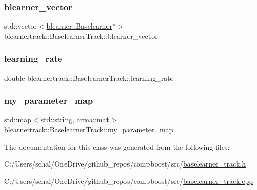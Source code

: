 \subsubsection{\texorpdfstring{blearner\+\_\+vector}{blearner\_vector}}
{\footnotesize\ttfamily std\+::vector$<$\mbox{\hyperlink{classblearner_1_1_baselearner}{blearner\+::\+Baselearner}}$\ast$$>$ blearnertrack\+::\+Baselearner\+Track\+::blearner\+\_\+vector\hspace{0.3cm}{\ttfamily [private]}}

\mbox{\label{classblearnertrack_1_1_baselearner_track_a62d743fe6171c52410e2f5da3dc58ffb}} 
\subsubsection{\texorpdfstring{learning\+\_\+rate}{learning\_rate}}
{\footnotesize\ttfamily double blearnertrack\+::\+Baselearner\+Track\+::learning\+\_\+rate\hspace{0.3cm}{\ttfamily [private]}}

\mbox{\label{classblearnertrack_1_1_baselearner_track_a3725470c87e28ea32d4b184f1e6aad39}} 
\subsubsection{\texorpdfstring{my\+\_\+parameter\+\_\+map}{my\_parameter\_map}}
{\footnotesize\ttfamily std\+::map$<$std\+::string, arma\+::mat$>$ blearnertrack\+::\+Baselearner\+Track\+::my\+\_\+parameter\+\_\+map\hspace{0.3cm}{\ttfamily [private]}}



The documentation for this class was generated from the following files\+:\begin{DoxyCompactItemize}
\item 
C\+:/\+Users/schal/\+One\+Drive/github\+\_\+repos/compboost/src/\mbox{\hyperlink{baselearner__track_8h}{baselearner\+\_\+track.\+h}}\item 
C\+:/\+Users/schal/\+One\+Drive/github\+\_\+repos/compboost/src/\mbox{\hyperlink{baselearner__track_8cpp}{baselearner\+\_\+track.\+cpp}}\end{DoxyCompactItemize}
